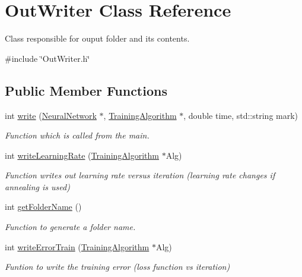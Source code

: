 \hypertarget{classOutWriter}{}\section{Out\+Writer Class Reference}
\label{classOutWriter}


Class responsible for ouput folder and its contents.  




{\ttfamily \#include \char`\"{}Out\+Writer.\+h\char`\"{}}

\subsection*{Public Member Functions}
\begin{DoxyCompactItemize}
\item 
int \hyperlink{classOutWriter_a2a180305b7da8b317dafc9a9071e191c}{write} (\hyperlink{classNeuralNetwork}{Neural\+Network} $\ast$, \hyperlink{classTrainingAlgorithm}{Training\+Algorithm} $\ast$, double time, std\+::string mark)
\begin{DoxyCompactList}\small\item\em Function which is called from the main. \end{DoxyCompactList}\item 
int \hyperlink{classOutWriter_a4d9f70ec3695f10de7d21c70ffe3a298}{write\+Learning\+Rate} (\hyperlink{classTrainingAlgorithm}{Training\+Algorithm} $\ast$Alg)
\begin{DoxyCompactList}\small\item\em Function writes out learning rate versus iteration (learning rate changes if annealing is used) \end{DoxyCompactList}\item 
int \hyperlink{classOutWriter_afbb71947cf92b3a37f03139bfb88d445}{get\+Folder\+Name} ()
\begin{DoxyCompactList}\small\item\em Function to generate a folder name. \end{DoxyCompactList}\item 
int \hyperlink{classOutWriter_a37eabfd7d351e4077225a933976db409}{write\+Error\+Train} (\hyperlink{classTrainingAlgorithm}{Training\+Algorithm} $\ast$Alg)
\begin{DoxyCompactList}\small\item\em Funtion to write the training error (loss function vs iteration) \end{DoxyCompactList}\item 

\end{DoxyCompactItemize}
